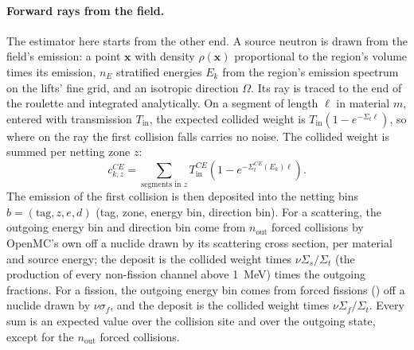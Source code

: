\paragraph{Forward rays from the field.} The estimator here starts from the other end. A source
neutron is drawn from the field's emission: a point $\mathbf x$ with density $\rho(\mathbf x)$
proportional to the region's volume times its emission, $n_E$ stratified energies $E_k$ from the
region's emission spectrum on the lifts' fine grid, and an isotropic direction $\Omega$. Its ray
is traced to the end of the roulette and integrated analytically. On a segment of length $\ell$ in
material $m$, entered with transmission $T_{\text{in}}$, the expected collided weight is
$T_{\text{in}}(1-e^{-\Sigma_t\ell})$, so where on the ray the first collision falls carries no
noise. The collided weight is summed per netting zone $z$:
\begin{equation}
c^{CE}_{k,z}=\sum_{\text{segments in }z}T^{CE}_{\text{in}}\left(1-e^{-\Sigma^{CE}_t(E_k)\ell}\right).
\end{equation}
The emission of the first collision is then deposited into the netting bins
$b=(\text{tag},z,e,d)$ (tag, zone, energy bin, direction bin). For a scattering, the outgoing energy
bin and direction bin come from $n_{\text{out}}$ forced collisions by OpenMC's own 
off a nuclide drawn by its scattering cross section, per material and source energy; the deposit is
the collided weight times $\nu\Sigma_s/\Sigma_t$ (the production of every non-fission channel above
1~MeV) times the outgoing fractions. For a fission, the outgoing energy bin comes from forced
fissions () off a nuclide drawn by $\nu\sigma_f$, and the deposit is
the collided weight times $\nu\Sigma_f/\Sigma_t$. Every sum is an expected value over the collision
site and over the outgoing state, except for the $n_{\text{out}}$ forced collisions.

